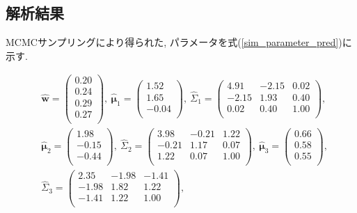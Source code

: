 \documentclass[a4j,12pt]{jarticle}
\begin{document}
\subsection{解析結果}

MCMCサンプリングにより得られた, パラメータを式(\ref{sim_parameter_pred})に示す. 

\begin{equation}
\label{sim_parameter_pred}
\begin{split}
&\hat {\bm w} = \begin{pmatrix} 0.20 \\ 0.24 \\ 0.29 \\ 0.27 \\ \end{pmatrix},\ 
\hat{\bm \mu}_1 = \begin{pmatrix} 1.52 \\ 1.65 \\ -0.04 \\ \end{pmatrix},\ 
\hat \Sigma_1 = \begin{pmatrix}  4.91 & -2.15 &  0.02 \\ -2.15 & 1.93 & 0.40 \\ 0.02 & 0.40 &1.00 \\ \end{pmatrix},\\ 
&\hat{\bm \mu}_2 = \begin{pmatrix} 1.98 \\ -0.15 \\ -0.44 \\ \end{pmatrix},\ 
\hat \Sigma_2 = \begin{pmatrix}   3.98 & -0.21 &  1.22 \\ -0.21 & 1.17 & 0.07 \\  1.22 & 0.07 &1.00 \\ \end{pmatrix},\ 
\hat{\bm \mu}_3 = \begin{pmatrix}  0.66 \\ 0.58 \\ 0.55 \\ \end{pmatrix},\\ 
&\hat \Sigma_3 = \begin{pmatrix}  2.35  & -1.98 &  -1.41 \\ -1.98 & 1.82 & 1.22 \\ -1.41 & 1.22 & 1.00 \\ \end{pmatrix},\ 

\end{split}
\end{equation}
\end{document}
